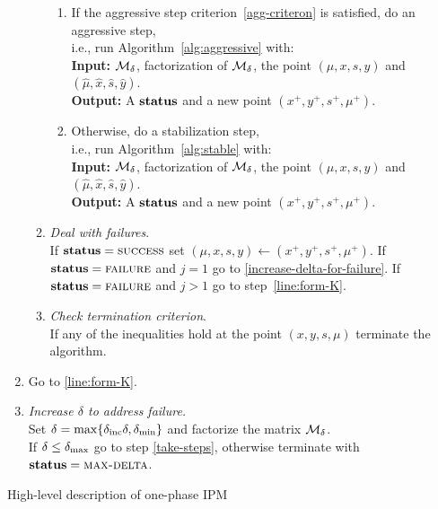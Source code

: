 \documentclass{article}
\begin{document}
\begin{algorithm}[H]
\begin{enumerate}[label*=A.{\arabic*}]
\begin{enumerate}[label*=.{\arabic*}]
\begin{enumerate}[label=-Case {\Roman*}]
\item If the aggressive step criterion~\eqref{agg-criteron} is satisfied, do an aggressive step, \\
i.e., run Algorithm~\ref{alg:aggressive} with: \\
\hspace*{0.1cm}  \textbf{Input:} $\mathcal{M}_{\delta}$, factorization of $\mathcal{M}_{\delta}$, the point $(\mu, x, s, y)$ and $(\hat{\mu}, \hat{x}, \hat{s}, \hat{y})$. \\
\hspace*{0.1cm}  \textbf{Output:} A $\textbf{status}$ and a new point $(x^{+},y^{+},s^{+}, \mu^{+})$.
\item Otherwise, do a stabilization step, \\
i.e., run Algorithm~\ref{alg:stable} with: \\
\hspace*{0.1cm} \textbf{Input:} $\mathcal{M}_{\delta}$, factorization of $\mathcal{M}_{\delta}$, the point $(\mu, x, s, y)$ and $(\hat{\mu}, \hat{x}, \hat{s}, \hat{y})$. \\
\hspace*{0.1cm} \textbf{Output:} A $\textbf{status}$ and a new point $(x^{+},y^{+},s^{+}, \mu^{+})$.
\end{enumerate}
\item \emph{Deal with failures}. \\
If $\textbf{status} = \textsc{success}$ set $(\mu, x, s, y) \gets (x^{+},y^{+},s^{+}, \mu^{+})$. If $\textbf{status} = \textsc{failure}$ and $j = 1$ go to \eqref{increase-delta-for-failure}.  If $\textbf{status} = \textsc{failure}$ and $j > 1$ go to step~\eqref{line:form-K}.
\item \emph{Check termination criterion}. \\
If any of the inequalities \termination{} hold at the point $(x,y,s,\mu)$ terminate the algorithm.
\end{enumerate}
\item 
Go to \eqref{line:form-K}.
\item \label{increase-delta-for-failure} \emph{Increase $\delta$ to address failure.} \\
Set $\delta = \max\{\delta_{\text{inc}} \delta, \delta_{\min} \}$ and factorize the matrix $\mathcal{M}_{\delta}$. \\
If $\delta \le \delta_{\max}$ go to step \eqref{take-steps}, otherwise terminate with $\textbf{status} = \textsc{max-delta}$.
\end{enumerate}
\caption{High-level description of one-phase IPM}\label{one-phase-IPM}
\end{algorithm}
\end{document}
